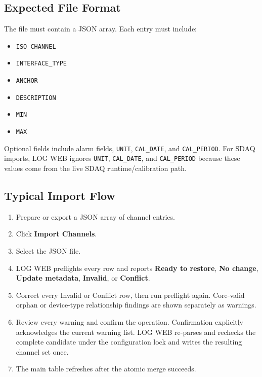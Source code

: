 \documentclass[11pt,a4paper]{article}
\begin{document}
\subsection{Expected File Format}
The file must contain a JSON array. Each entry must include:

\begin{itemize}
\item \texttt{ISO\_CHANNEL}
\item \texttt{INTERFACE\_TYPE}
\item \texttt{ANCHOR}
\item \texttt{DESCRIPTION}
\item \texttt{MIN}
\item \texttt{MAX}
\end{itemize}

Optional fields include alarm fields, \texttt{UNIT}, \texttt{CAL\_DATE}, and \texttt{CAL\_PERIOD}. For SDAQ imports, LOG WEB ignores \texttt{UNIT}, \texttt{CAL\_DATE}, and \texttt{CAL\_PERIOD} because these values come from the live SDAQ runtime/calibration path.

\subsection{Typical Import Flow}
\begin{enumerate}
\item Prepare or export a JSON array of channel entries.
\item Click \textbf{Import Channels}.
\item Select the JSON file.
\item LOG WEB preflights every row and reports \textbf{Ready to restore}, \textbf{No change}, \textbf{Update metadata}, \textbf{Invalid}, or \textbf{Conflict}.
\item Correct every Invalid or Conflict row, then run preflight again. Core-valid orphan or device-type relationship findings are shown separately as warnings.
\item Review every warning and confirm the operation. Confirmation explicitly acknowledges the current warning list. LOG WEB re-parses and rechecks the complete candidate under the configuration lock and writes the resulting channel set once.
\item The main table refreshes after the atomic merge succeeds.
\end{enumerate}
\end{document}

